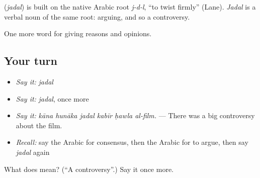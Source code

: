 \begin{cousinweb}
\textbf{} (\emph{jadal}) is built on the native Arabic root \emph{j-d-l}, \textquotedblleft{}to twist firmly\textquotedblright{} (Lane). \emph{Jadal} is a verbal noun of the same root: arguing, and so a controversy.
\end{cousinweb}

\begin{grammarlens}[title={What you've built}]
One more word for giving reasons and opinions.
\end{grammarlens}

\subsection*{Your turn}
\begin{itemize}
\raggedright
  \item \emph{Say it:} \emph{jadal}
  \item \emph{Say it:} \emph{jadal}, once more
  \item \emph{Say it:} \emph{kāna hunāka jadal kabīr ḥawla al-film.} — There was a big controversy about the film.
  \item \emph{Recall:} say the Arabic for consensus, then the Arabic for to argue, then say \emph{jadal} again
\end{itemize}

\begin{tcolorbox}[breakable,colback=teal!4,colframe=teal!35!black,title={Before you move on}]
What does  mean? (\textquotedblleft{}A controversy\textquotedblright{}.) Say it once more.
\end{tcolorbox}
